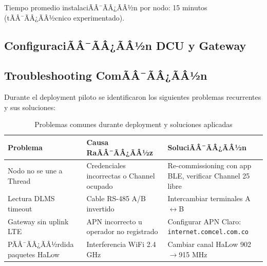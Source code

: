 Tiempo promedio instalaciÃÂ¯ÃÂ¿ÃÂ½n por nodo: 15 minutos (tÃÂ¯ÃÂ¿ÃÂ½cnico experimentado).


\subsection{ConfiguraciÃÂ¯ÃÂ¿ÃÂ½n DCU y Gateway}


\subsection{Troubleshooting ComÃÂ¯ÃÂ¿ÃÂ½n}

Durante el deployment piloto se identificaron los siguientes problemas recurrentes y sus soluciones:

\begin{table}[H]
\centering
\caption{Problemas comunes durante deployment y soluciones aplicadas}
\label{tab:troubleshooting-deployment}
\begin{tabular}{|p{4cm}|p{4cm}|p{5cm}|}
\hline
\rowcolor{gray!20}
\textbf{Problema} & \textbf{Causa RaÃÂ¯ÃÂ¿ÃÂ½z} & \textbf{SoluciÃÂ¯ÃÂ¿ÃÂ½n} \\
\hline
Nodo no se une a Thread & Credenciales incorrectas o Channel ocupado & Re-commissioning con app BLE, verificar Channel 25 libre \\
\hline
Lectura DLMS timeout & Cable RS-485 A/B invertido & Intercambiar terminales A$\leftrightarrow$B \\
\hline
Gateway sin uplink LTE & APN incorrecto u operador no registrado & Configurar APN Claro: \texttt{internet.comcel.com.co} \\
\hline
PÃÂ¯ÃÂ¿ÃÂ½rdida paquetes HaLow & Interferencia WiFi 2.4 GHz & Cambiar canal HaLow 902$\rightarrow$915 MHz \\
\hline
\end{tabular}
\end{table}

